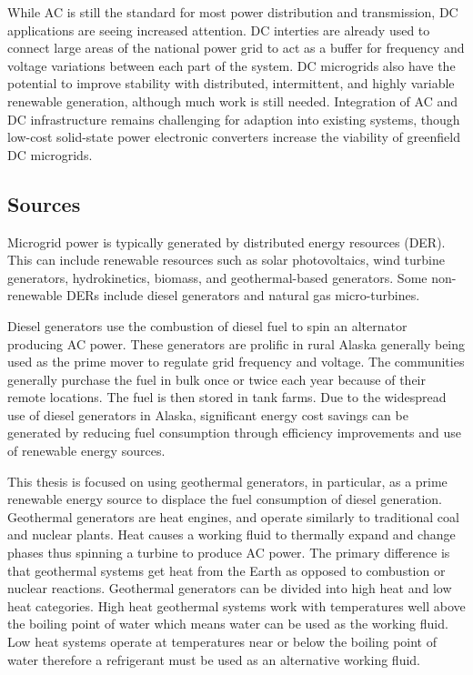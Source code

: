 While AC is still the standard for most power distribution and transmission, DC applications are seeing increased attention. DC interties are already used to connect large areas of the national power grid to act as a buffer for frequency and voltage variations between each part of the system. DC microgrids also have the potential to improve stability with distributed, intermittent, and highly variable renewable generation, although much work is still needed. Integration of AC and DC infrastructure remains challenging for adaption into existing systems, though low-cost solid-state power electronic converters increase the viability of greenfield DC microgrids.

\subsection{Sources}
Microgrid power is typically generated by distributed energy resources (DER). This can include renewable resources such as solar photovoltaics, wind turbine generators, hydrokinetics, biomass, and geothermal-based generators. Some non-renewable DERs include diesel generators and natural gas micro-turbines. 

Diesel generators use the combustion of diesel fuel to spin an alternator producing AC power. These generators are prolific in rural Alaska generally being used as the prime mover to regulate grid frequency and voltage. The communities  generally purchase the fuel in bulk once or twice each year because of their remote locations. The fuel is then stored in tank farms.
Due to the widespread use of diesel generators in Alaska, significant energy cost savings can be generated by reducing fuel consumption through efficiency improvements and use of renewable energy sources. 

This thesis is focused on using geothermal generators, in particular, as a prime renewable energy source to displace the fuel consumption of diesel generation. Geothermal generators are heat engines, and operate similarly to traditional coal and nuclear plants. Heat causes a working fluid to thermally expand and change phases thus spinning a turbine to produce AC power. The primary difference is that geothermal systems get heat from the Earth as opposed to combustion or nuclear reactions. Geothermal generators can be divided into high heat and low heat categories. High heat geothermal systems work with temperatures well above the boiling point of water which means water can be used as the working fluid. Low heat systems operate at temperatures near or below the boiling point of water therefore a refrigerant must be used as an alternative working fluid. 

